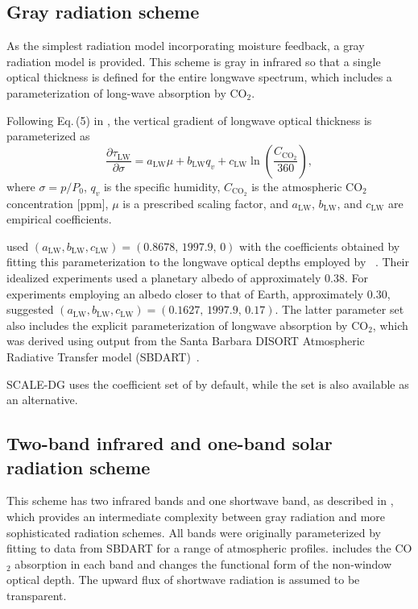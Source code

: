 \subsection{Gray radiation scheme}\label{sec:gray_radiation}
As the simplest radiation model incorporating moisture feedback, a gray radiation model is provided. 
This scheme is gray in infrared so that a single optical thickness is defined for the entire longwave spectrum, 
which includes a parameterization of long-wave absorption by CO$_2$.


Following Eq.\,(5) in \cite{Vallis2018}, 
the vertical gradient of longwave optical thickness is parameterized as
\begin{equation}
\frac{\partial \tau_{\mathrm{LW}}}{\partial \sigma}
=
a_{\mathrm{LW}}\mu + b_{\mathrm{LW}} q_v + c_{\mathrm{LW}} \ln\!\left(\frac{C_{\mathrm{CO_2}}}{360}\right),
\label{eq:gray_radiation_tau}
\end{equation}
where $\sigma=p/P_0$, $q_v$ is the specific humidity,
$C_{\mathrm{CO_2}}$ is the atmospheric CO$_2$ concentration [ppm],
$\mu$ is a prescribed scaling factor,
and $a_{\mathrm{LW}}$, $b_{\mathrm{LW}}$, and $c_{\mathrm{LW}}$ are empirical coefficients.

\cite{Byrne2013} used $(a_{\mathrm{LW}}, b_{\mathrm{LW}}, c_{\mathrm{LW}})= (0.8678,\,1997.9,\,0)$
with the coefficients obtained by fitting this parameterization to the longwave optical depths employed by ~\cite{Frierson2006}.
Their idealized experiments used a planetary albedo of approximately $0.38$.
For experiments employing an albedo closer to that of Earth, approximately $0.30$, 
\cite{Vallis2018} suggested $(a_{\mathrm{LW}}, b_{\mathrm{LW}}, c_{\mathrm{LW}})= (0.1627,\,1997.9,\,0.17)$.
The latter parameter set also includes the explicit parameterization of longwave absorption by CO$_2$,
which was derived using output from the Santa Barbara DISORT Atmospheric Radiative Transfer model (SBDART)~\citep{Ricchiazzi1998}.


SCALE-DG uses the coefficient set of \cite{Vallis2018} by default, 
while the \cite{Byrne2013} set is also available as an alternative.


\subsection{Two-band infrared and one-band solar radiation scheme}\label{sec:two_band_radiation}
This scheme has two infrared bands and one shortwave band, as described in \cite{Geen2016}, 
which provides an intermediate complexity between gray radiation and more sophisticated radiation schemes.
All bands were originally parameterized by fitting to data from SBDART for a range of atmospheric profiles. 
 \cite{Vallis2018} includes the CO$_2$ absorption in each band and changes the functional form of the non-window optical depth.
 The upward flux of shortwave radiation is assumed to be transparent.

